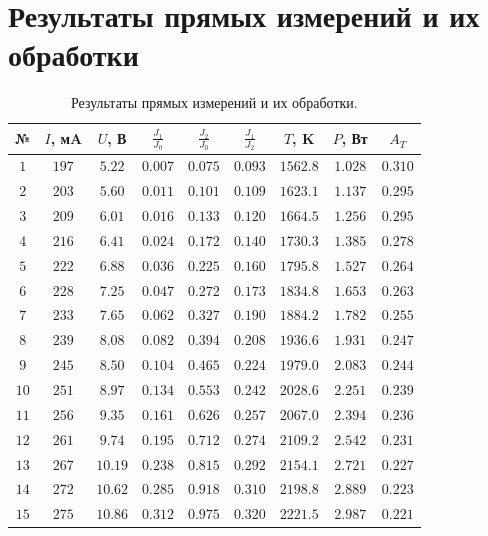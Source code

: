 \documentclass{article}
\begin{document}
\section{Результаты прямых измерений и их обработки}
\begin{table}[h]
    \centering
    \bgroup
    \def\arraystretch{1.4}
    \begin{tabular}{|c|c|c|c|c|c|c|c|c|}
        \hline
        № & $I$, мA & $U$, В & $\frac{J_1}{J_0}$ & $\frac{J_2}{J_0}$ & $\frac{J_1}{J_2}$ & $T$, K & $P$, Вт & $A_{T}$ \\ \hline
        $ 1 $ & $ 197 $ & $ 5.22 $ & $ 0.007 $ & $ 0.075 $ & $ 0.093 $ & $ 1562.8 $ & $ 1.028 $ & $ 0.310 $\\ \hline
        $ 2 $ & $ 203 $ & $ 5.60 $ & $ 0.011 $ & $ 0.101 $ & $ 0.109 $ & $ 1623.1 $ & $ 1.137 $ & $ 0.295 $\\ \hline
        $ 3 $ & $ 209 $ & $ 6.01 $ & $ 0.016 $ & $ 0.133 $ & $ 0.120 $ & $ 1664.5 $ & $ 1.256 $ & $ 0.295 $\\ \hline
        $ 4 $ & $ 216 $ & $ 6.41 $ & $ 0.024 $ & $ 0.172 $ & $ 0.140 $ & $ 1730.3 $ & $ 1.385 $ & $ 0.278 $\\ \hline
        $ 5 $ & $ 222 $ & $ 6.88 $ & $ 0.036 $ & $ 0.225 $ & $ 0.160 $ & $ 1795.8 $ & $ 1.527 $ & $ 0.264 $\\ \hline
        $ 6 $ & $ 228 $ & $ 7.25 $ & $ 0.047 $ & $ 0.272 $ & $ 0.173 $ & $ 1834.8 $ & $ 1.653 $ & $ 0.263 $\\ \hline
        $ 7 $ & $ 233 $ & $ 7.65 $ & $ 0.062 $ & $ 0.327 $ & $ 0.190 $ & $ 1884.2 $ & $ 1.782 $ & $ 0.255 $\\ \hline
        $ 8 $ & $ 239 $ & $ 8.08 $ & $ 0.082 $ & $ 0.394 $ & $ 0.208 $ & $ 1936.6 $ & $ 1.931 $ & $ 0.247 $\\ \hline
        $ 9 $ & $ 245 $ & $ 8.50 $ & $ 0.104 $ & $ 0.465 $ & $ 0.224 $ & $ 1979.0 $ & $ 2.083 $ & $ 0.244 $\\ \hline
        $ 10 $ & $ 251 $ & $ 8.97 $ & $ 0.134 $ & $ 0.553 $ & $ 0.242 $ & $ 2028.6 $ & $ 2.251 $ & $ 0.239 $\\ \hline
        $ 11 $ & $ 256 $ & $ 9.35 $ & $ 0.161 $ & $ 0.626 $ & $ 0.257 $ & $ 2067.0 $ & $ 2.394 $ & $ 0.236 $\\ \hline
        $ 12 $ & $ 261 $ & $ 9.74 $ & $ 0.195 $ & $ 0.712 $ & $ 0.274 $ & $ 2109.2 $ & $ 2.542 $ & $ 0.231 $\\ \hline
        $ 13 $ & $ 267 $ & $ 10.19 $ & $ 0.238 $ & $ 0.815 $ & $ 0.292 $ & $ 2154.1 $ & $ 2.721 $ & $ 0.227 $\\ \hline
        $ 14 $ & $ 272 $ & $ 10.62 $ & $ 0.285 $ & $ 0.918 $ & $ 0.310 $ & $ 2198.8 $ & $ 2.889 $ & $ 0.223 $\\ \hline
        $ 15 $ & $ 275 $ & $ 10.86 $ & $ 0.312 $ & $ 0.975 $ & $ 0.320 $ & $ 2221.5 $ & $ 2.987 $ & $ 0.221 $\\ \hline
    \end{tabular}
    \egroup
    \caption{Результаты прямых измерений и их обработки.} 
\end{table}
\newpage
\end{document}
